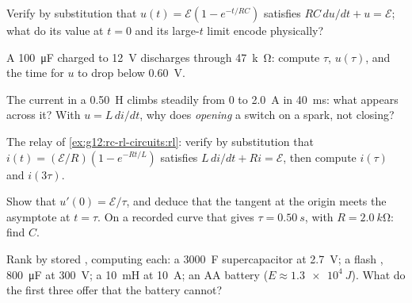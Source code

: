 \begin{exercise}[$\star\star$]\label{exo:g12:rc-rl-circuits:7}
Verify by substitution that $u(t) = \mathcal{E}(1 - e^{-t/RC})$
satisfies $RC\,du/dt + u = \mathcal{E}$; what do its value at $t = 0$
and its large-$t$ limit encode physically?
\end{exercise}

\begin{exercise}[$\star\star$]\label{exo:g12:rc-rl-circuits:8}
A \qty{100}{\micro F}  charged to \qty{12}{V} discharges through
\qty{47}{k\ohm}: compute $\tau$, $u(\tau)$, and the time for $u$ to drop
below \qty{0.60}{V}.
\end{exercise}

\begin{exercise}[$\star\star$]\label{exo:g12:rc-rl-circuits:9}
The current in a \qty{0.50}{H}  climbs steadily from $0$ to
\qty{2.0}{A} in \qty{40}{ms}: what  appears across it? With
$u = L\,di/dt$, why does \emph{opening} a switch on a  spark, not closing?
\end{exercise}

\begin{exercise}[$\star\star$]\label{exo:g12:rc-rl-circuits:10}
The relay of \cref{ex:g12:rc-rl-circuits:rl}: verify by substitution that
$i(t) = (\mathcal{E}/R)(1 - e^{-Rt/L})$ satisfies
$L\,di/dt + Ri = \mathcal{E}$, then compute $i(\tau)$ and $i(3\tau)$.
\end{exercise}

\begin{exercise}[$\star\star$]\label{exo:g12:rc-rl-circuits:11}
Show that $u'(0) = \mathcal{E}/\tau$, and deduce that the tangent at
the origin meets the asymptote at $t = \tau$. On a recorded curve that
gives $\tau = \qty{0.50}{s}$, with $R = \qty{2.0}{k\ohm}$: find $C$.
\end{exercise}

\begin{exercise}[$\star\star\star$]\label{exo:g12:rc-rl-circuits:12}
Rank by stored , computing each: a \qty{3000}{F} supercapacitor
at \qty{2.7}{V}; a flash , \qty{800}{\micro F} at
\qty{300}{V}; a \qty{10}{mH}  at \qty{10}{A}; an AA battery
($E \approx \qty{1.3e4}{J}$). What do the first three offer that the
battery cannot?
\end{exercise}


